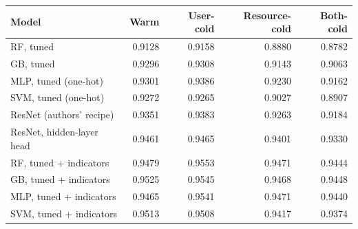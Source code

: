 \begin{tabular}{lrrrr}
\toprule
Model & Warm & User-cold & Resource-cold & Both-cold \\
\midrule
RF, tuned & 0.9128 & 0.9158 & 0.8880 & 0.8782 \\
GB, tuned & 0.9296 & 0.9308 & 0.9143 & 0.9063 \\
MLP, tuned (one-hot) & 0.9301 & 0.9386 & 0.9230 & 0.9162 \\
SVM, tuned (one-hot) & 0.9272 & 0.9265 & 0.9027 & 0.8907 \\
\midrule
ResNet (authors' recipe) & 0.9351 & 0.9383 & 0.9263 & 0.9184 \\
ResNet, hidden-layer head & 0.9461 & 0.9465 & 0.9401 & 0.9330 \\
\midrule
RF, tuned + indicators & 0.9479 & 0.9553 & 0.9471 & 0.9444 \\
GB, tuned + indicators & 0.9525 & 0.9545 & 0.9468 & 0.9448 \\
MLP, tuned + indicators & 0.9465 & 0.9541 & 0.9471 & 0.9440 \\
SVM, tuned + indicators & 0.9513 & 0.9508 & 0.9417 & 0.9374 \\
\bottomrule
\end{tabular}
